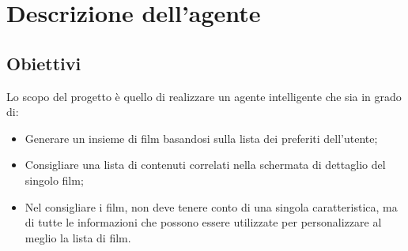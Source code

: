 \documentclass[a4paper,12pt]{article}
\begin{document}
\section{Descrizione dell’agente}

    \subsection{Obiettivi}
			Lo scopo del progetto è quello di realizzare un agente intelligente che sia in grado di:
	\begin{itemize}
		 \item Generare un insieme di film basandosi sulla lista dei preferiti dell'utente;
		 \item Consigliare una lista di contenuti correlati nella schermata di dettaglio del singolo film;
  		 \item Nel consigliare i film, non deve tenere conto di una singola caratteristica, ma di tutte le informazioni che possono essere utilizzate per personalizzare al meglio la lista di film.
	\end{itemize}

\newpage %
\end{document}
